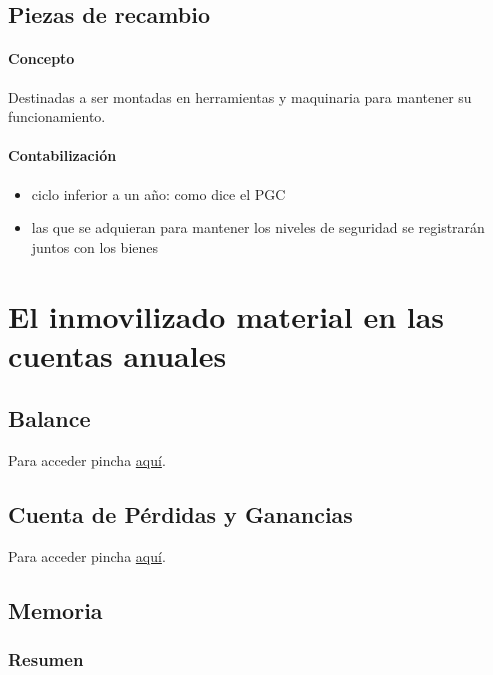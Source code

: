 \documentclass[a4paper,12pt]{article}
\begin{document}
\subsection*{Piezas de recambio}
\paragraph{Concepto}
Destinadas a ser montadas en herramientas y maquinaria para mantener su funcionamiento.

\paragraph{Contabilización}
\begin{itemize}
    \item ciclo inferior a un año: como dice el PGC
    \item las que se adquieran para mantener los niveles de seguridad se registrarán juntos con los bienes
\end{itemize}

\section{El inmovilizado material en las cuentas anuales}
\subsection{Balance}
Para acceder pincha \href{https://github.com/ElblogdeIsmael/ElblogdeIsmael.github.io/blob/main/Asignaturas/Tercer%20A%C3%B1o/CF1/Resumenes/Tema5/FCCEE/images/imagen1.png}{aquí}.
\subsection{Cuenta de Pérdidas y Ganancias}
Para acceder pincha \href{https://github.com/ElblogdeIsmael/ElblogdeIsmael.github.io/blob/main/Asignaturas/Tercer%20A%C3%B1o/CF1/Resumenes/Tema5/FCCEE/images/imagen2.png}{aquí}.
\subsection{Memoria}
\subsubsection{Resumen}
\end{document}
